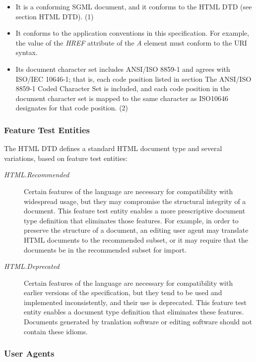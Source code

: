 \par \begin{itemize}\item 
It is a conforming SGML document, and it conforms to the HTML DTD
(see section HTML DTD).
(1)\item 
It conforms to the application conventions in this
specification.  For example, the value of the {\it HREF} attribute of
the {\it A} element must conform to the URI syntax.
\item 
Its document character set includes ANSI/ISO 8859-1 and agrees with
ISO/IEC 10646-1;  that is, each code position listed in section The ANSI/ISO 8859-1 Coded Character Set is included, and each code position in the document
character set is mapped to the same character as ISO10646 designates
for that code position.
(2)\end{itemize}\subsubsection*{Feature Test Entities}\par 
The HTML DTD defines a standard HTML document type and several
variations, based on feature test entities:
\par \begin{description}\item[{\it HTML.Recommended}]
Certain features of the language are
necessary for compatibility with widespread usage, but they may
compromise the structural integrity of a document.  This feature test
entity enables a more prescriptive document type definition that
eliminates those features.
For example, in order to preserve the structure of a document, an
editing user agent may translate HTML documents to the recommended
subset, or it may require that the documents be in the recommended
subset for import.
\item[{\it HTML.Deprecated}]
Certain features of the language are
necessary for compatibility with earlier versions of the
specification, but they tend to be used and implemented inconsistently,
and their use is deprecated.  This feature test entity enables a
document type definition that eliminates these features.
Documents generated by tranlation software or editing software should not
contain these idioms.
\end{description}\subsubsection*{User Agents}\par 

